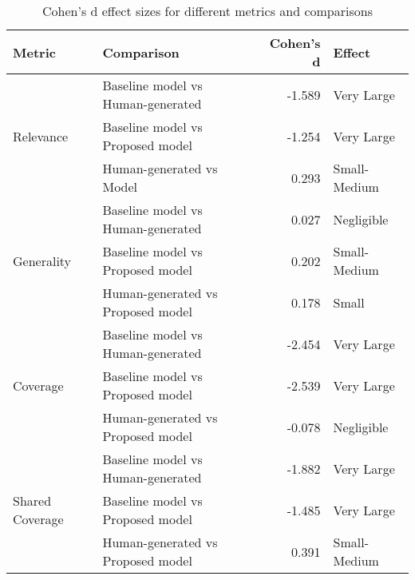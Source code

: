 \begin{table}[h]
    \centering
    \begin{tabular}{llrl}
        \hline
        \textbf{Metric} & \textbf{Comparison} & \textbf{Cohen's d} & \textbf{Effect} \\
        \hline
        \multirow{3}{*}{Relevance}
                        & Baseline model vs Human-generated   & -1.589             & Very Large      \\
                        & Baseline model  vs Proposed model   & -1.254             & Very Large      \\
                        & Human-generated vs Model      & 0.293              & Small-Medium    \\
        \hline
        \multirow{3}{*}{Generality}
                        & Baseline model vs Human-generated   & 0.027              & Negligible      \\
                        & Baseline model vs Proposed model   & 0.202              & Small-Medium    \\
                        & Human-generated vs Proposed model      & 0.178              & Small           \\
        \hline
        \multirow{3}{*}{Coverage}
                        & Baseline model vs Human-generated   & -2.454             & Very Large      \\
                        & Baseline model vs Proposed model   & -2.539             & Very Large      \\
                        & Human-generated vs Proposed model      & -0.078             & Negligible      \\
        \hline
        \multirow{3}{*}{Shared Coverage}
                        & Baseline model vs Human-generated   & -1.882             & Very Large      \\
                        & Baseline model vs Proposed model   & -1.485             & Very Large      \\
                        & Human-generated vs Proposed model      & 0.391              & Small-Medium    \\
        \hline
    \end{tabular}
    \caption{Cohen's d effect sizes for different metrics and comparisons}
    \label{tab:cohens_d}
\end{table}